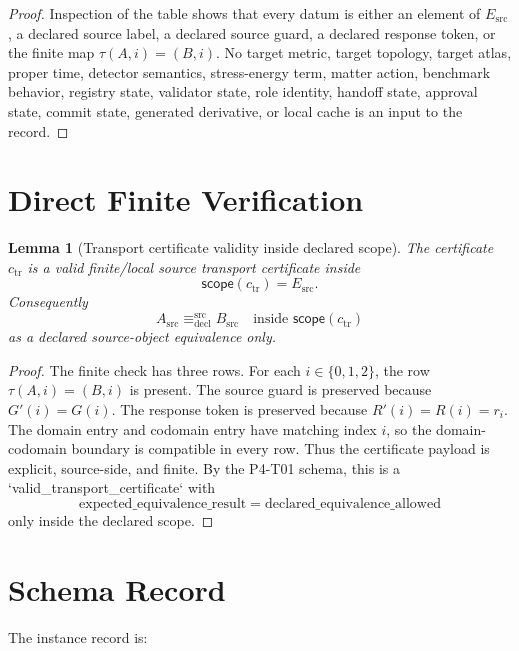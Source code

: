 \documentclass[11pt]{article}
\newcommand{\Esrc}{E_{\mathrm{src}}}
\newcommand{\Asrc}{A_{\mathrm{src}}}
\newcommand{\Bsrc}{B_{\mathrm{src}}}
\newcommand{\Scope}{\mathsf{scope}}
\newcommand{\DeclEq}{\equiv_{\mathrm{decl}}^{\mathrm{src}}}
\newtheorem{lemma}{Lemma}
\begin{document}
\begin{proof}
Inspection of the table shows that every datum is either an element of
\(\Esrc\), a declared source label, a declared source guard, a declared
response token, or the finite map \(\tau(A,i)=(B,i)\). No target metric,
target topology, target atlas, proper time, detector semantics,
stress-energy term, matter action, benchmark behavior, registry state,
validator state, role identity, handoff state, approval state, commit state,
generated derivative, or local cache is an input to the record.
\end{proof}

\section{Direct Finite Verification}

\begin{lemma}[Transport certificate validity inside declared scope]
The certificate \(c_{\mathrm{tr}}\) is a valid finite/local source transport
certificate inside
\[
  \Scope(c_{\mathrm{tr}})=\Esrc.
\]
Consequently
\[
  \Asrc \DeclEq \Bsrc \quad\text{inside } \Scope(c_{\mathrm{tr}})
\]
as a declared source-object equivalence only.
\end{lemma}

\begin{proof}
The finite check has three rows. For each \(i\in\{0,1,2\}\), the row
\(\tau(A,i)=(B,i)\) is present. The source guard is preserved because
\(G'(i)=G(i)\). The response token is preserved because \(R'(i)=R(i)=r_i\).
The domain entry and codomain entry have matching index \(i\), so the
domain-codomain boundary is compatible in every row. Thus the certificate
payload is explicit, source-side, and finite. By the P4-T01 schema, this is a
`valid_transport_certificate` with
\[
  \mathrm{expected\_equivalence\_result}
  =\mathrm{declared\_equivalence\_allowed}
\]
only inside the declared scope.
\end{proof}

\section{Schema Record}

The instance record is:
\end{document}
